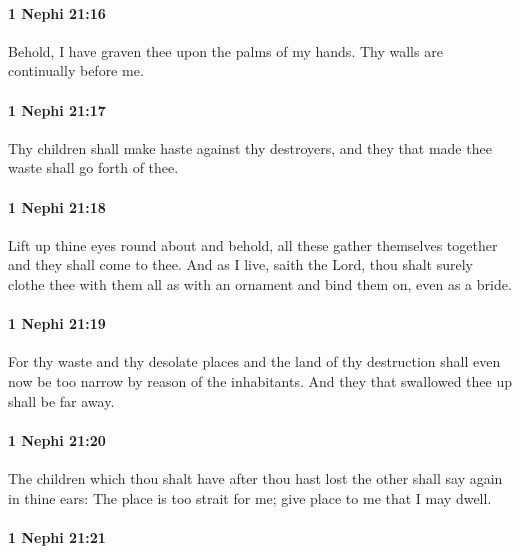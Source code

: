 		\paragraph{1 Nephi 21:16} %
			\label{1NEPHI-21-16}

			Behold, I have graven thee upon the palms of my hands.
			Thy walls are continually before me.

		\paragraph{1 Nephi 21:17} %
			\label{1NEPHI-21-17}

			Thy children shall make haste against thy destroyers,
			and they that made thee waste shall go forth of thee.

		\paragraph{1 Nephi 21:18} %
			\label{1NEPHI-21-18}

			Lift up thine eyes round about and behold,
			all these gather themselves together
			and they shall come to thee.
			And as I live, saith the Lord,
			thou shalt surely clothe thee with them all as with an ornament
			and bind them on, even as a bride.

		\paragraph{1 Nephi 21:19} %
			\label{1NEPHI-21-19}

			For thy waste and thy desolate places and the land of thy destruction
			shall even now be too narrow by reason of the inhabitants.
			And they that swallowed thee up shall be far away.

		\paragraph{1 Nephi 21:20} %
			\label{1NEPHI-21-20}

			The children which thou shalt have after thou hast lost the other
			shall say again in thine ears:
			The place is too strait for me;
			give place to me that I may dwell.

		\paragraph{1 Nephi 21:21} %
			\label{1NEPHI-21-21}

